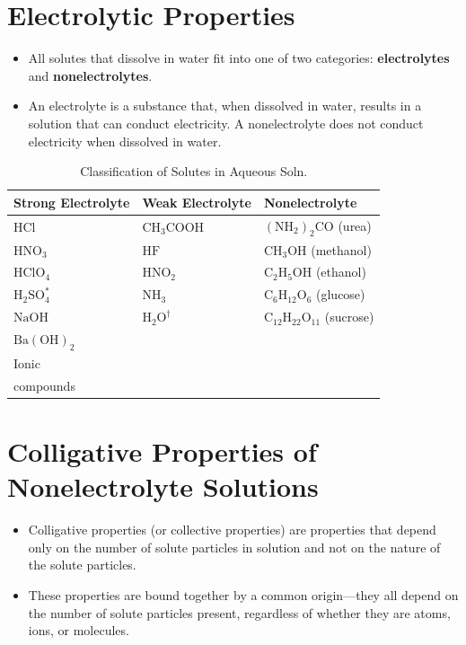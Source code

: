 \documentclass[a4paper,12pt,twocolumn]{article}
\begin{document}
\section{Electrolytic Properties}
\begin{itemize}
\item All solutes that dissolve in water fit into one of two categories: \textbf{electrolytes} and \textbf{nonelectrolytes}. 
\item An electrolyte is a substance that, when dissolved in water, results in a solution that can conduct electricity. A nonelectrolyte does not conduct electricity when dissolved in water.

\end{itemize}

\begin{table}[h]
\centering
\begin{tabular}{|p{2cm}|l|l|}
\hline
Strong Electrolyte & Weak Electrolyte & Nonelectrolyte \\
\hline $\mathrm{HCl}$ & $\mathrm{CH}_3 \mathrm{COOH}$ & $\left(\mathrm{NH}_2\right)_2 \mathrm{CO}$ (urea) \\
$\mathrm{HNO}_3$ & $\mathrm{HF}$ & $\mathrm{CH}_3 \mathrm{OH}$ (methanol) \\
$\mathrm{HClO}_4$ & $\mathrm{HNO}_2$ & $\mathrm{C}_2 \mathrm{H}_5 \mathrm{OH}$ (ethanol) \\
$\mathrm{H}_2 \mathrm{SO}_4^*$ & $\mathrm{NH}_3$ & $\mathrm{C}_6 \mathrm{H}_{12} \mathrm{O}_6$ (glucose) \\
$\mathrm{NaOH}$ & $\mathrm{H}_2 \mathrm{O}^{\dagger}$ & $\mathrm{C}_{12} \mathrm{H}_{22} \mathrm{O}_{11}$ (sucrose) \\
$\mathrm{Ba}(\mathrm{OH})_2$ & & \\
Ionic & & \\
compounds & & \\ \hline
\end{tabular}
\caption{Classification of Solutes in Aqueous Soln.}
\end{table}

\section{Colligative Properties of Nonelectrolyte Solutions}
\begin{itemize}
\item Colligative properties (or collective properties) are properties that depend only on the number of solute particles in solution and not on the nature of the solute particles.
\item These properties are bound together by a common origin—they all depend on the number of solute particles present, regardless of whether they are atoms, ions, or molecules.
\end{itemize}
\end{document}
